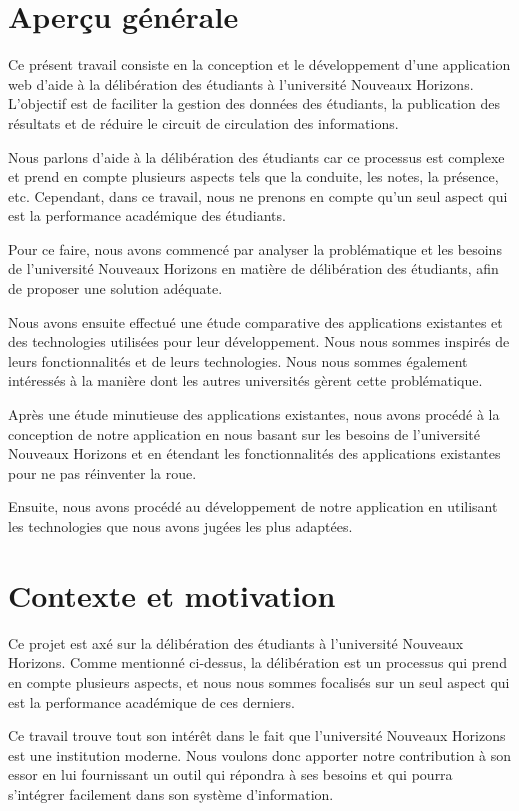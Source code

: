 \section{Aperçu générale}
Ce présent travail consiste en la conception et le développement d'une application web d'aide à la délibération des étudiants à l'université Nouveaux Horizons. L'objectif est de faciliter la gestion des données des étudiants, la publication des résultats et de réduire le circuit de circulation des informations.

Nous parlons d'aide à la délibération des étudiants car ce processus est complexe et prend en compte plusieurs aspects tels que la conduite, les notes, la présence, etc. Cependant, dans ce travail, nous ne prenons en compte qu'un seul aspect qui est la performance académique des étudiants.

Pour ce faire, nous avons commencé par analyser la problématique et les besoins de l'université Nouveaux Horizons en matière de délibération des étudiants, afin de proposer une solution adéquate.

Nous avons ensuite effectué une étude comparative des applications existantes et des technologies utilisées pour leur développement. Nous nous sommes inspirés de leurs fonctionnalités et de leurs technologies. Nous nous sommes également intéressés à la manière dont les autres universités gèrent cette problématique.

Après une étude minutieuse des applications existantes, nous avons procédé à la conception de notre application en nous basant sur les besoins de l'université Nouveaux Horizons et en étendant les fonctionnalités des applications existantes pour ne pas réinventer la roue.

Ensuite, nous avons procédé au développement de notre application en utilisant les technologies que nous avons jugées les plus adaptées.

\section{Contexte et motivation}
Ce projet est axé sur la délibération des étudiants à l'université Nouveaux Horizons. Comme mentionné ci-dessus, la délibération est un processus qui prend en compte plusieurs aspects, et nous nous sommes focalisés sur un seul aspect qui est la performance académique de ces derniers.

Ce travail trouve tout son intérêt dans le fait que l'université Nouveaux Horizons est une institution moderne. Nous voulons donc apporter notre contribution à son essor en lui fournissant un outil qui répondra à ses besoins et qui pourra s'intégrer facilement dans son système d'information.

